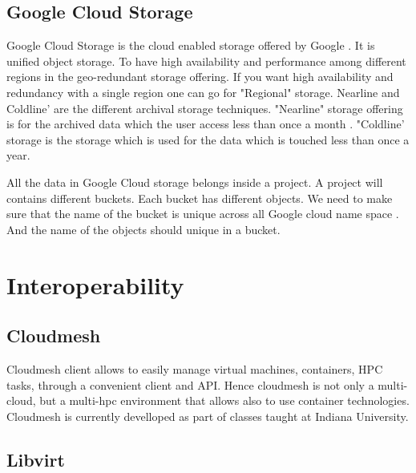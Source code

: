 {     \pv

\subsection{Google Cloud Storage}

     Google Cloud Storage is the cloud enabled storage offered by
     Google \cite{www-google-cloud-storage}. It is unified object
     storage. To have high availability and performance among
     different regions in the geo-redundant storage offering. If you
     want high availability and redundancy with a single region one
     can go for "Regional" storage. Nearline and Coldline’ are the
     different archival storage techniques. "Nearline" storage
     offering is for the archived data which the user access less than
     once a month . "Coldline’ storage is the storage which is used
     for the data which is touched less than once a year.

     All the data in Google Cloud storage belongs inside a project. A
     project will contains different buckets. Each bucket has
     different objects. We need to make sure that the name of the
     bucket is unique across all Google cloud name space . And the
     name of the objects should unique in a bucket.

     \pv


\section{Interoperability}
\label{S:o-interoperability}


\subsection{Cloudmesh}

Cloudmesh client allows to easily manage virtual machines, containers,
HPC tasks, through a convenient client and API. Hence cloudmesh is not
only a multi-cloud, but a multi-hpc environment that allows also to
use container technologies. Cloudmesh is currently develloped as part
of classes taught at Indiana University.

\pv

\subsection{Libvirt}

}
